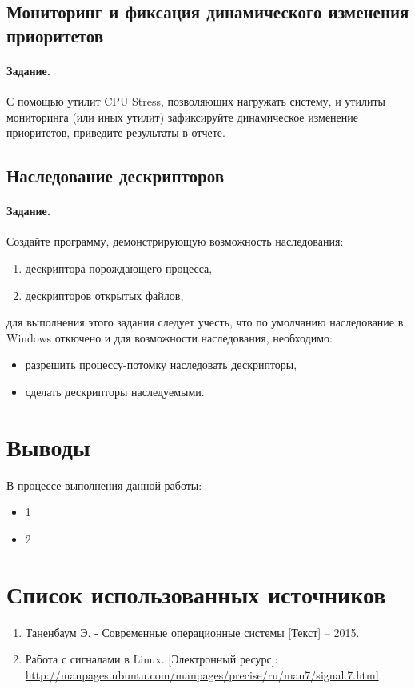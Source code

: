 \subsection{Мониторинг и фиксация динамического изменения приоритетов}

\paragraph{Задание.} С помощью утилит CPU Stress, позволяющих нагружать систему, и утилиты мониторинга  (или иных утилит) зафиксируйте динамическое изменение приоритетов, приведите результаты в отчете.

\subsection{Наследование дескрипторов}

\paragraph{Задание.} Создайте программу, демонстрирующую возможность наследования:
\begin{enumerate}
	\item дескриптора порождающего процесса,
	\item дескрипторов открытых файлов,
\end{enumerate}
для выполнения этого задания следует учесть, что по умолчанию наследование в Windows откючено и для возможности наследования, необходимо:
\begin{itemize}
	\item разрешить процессу-потомку наследовать дескрипторы,
	\item сделать дескрипторы наследуемыми.
\end{itemize}






\section{Выводы}

В процессе выполнения данной работы:
\begin{itemize}
	\item 1
	\item 2
\end{itemize}

\section*{Список использованных источников}

\begin{enumerate}
	\item Таненбаум Э. - Современные операционные системы [Текст] -- 2015.
	\item Работа с сигналами в Linux. [Электронный ресурс]:\\
		{\small\url{http://manpages.ubuntu.com/manpages/precise/ru/man7/signal.7.html}} 
\end{enumerate}


